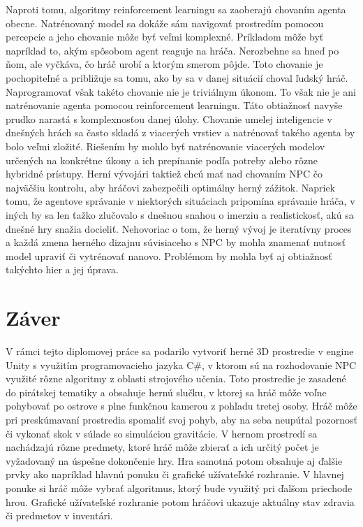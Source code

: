 \documentclass[slovak, master]{diploma}
\begin{document}
Naproti tomu, algoritmy reinforcement learningu sa zaoberajú chovaním agenta obecne. Natrénovaný model sa dokáže sám navigovať prostredím pomocou percepcie a jeho chovanie môže byť veľmi komplexné. Príkladom môže byť napríklad to, akým spôsobom agent reaguje na hráča. Nerozbehne sa hneď po ňom, ale vyčkáva, čo hráč urobí a ktorým smerom pôjde. Toto chovanie je pochopiteľné a približuje sa tomu, ako by sa v danej situácií choval ľudský hráč. Naprogramovať však takéto chovanie nie je triviálnym úkonom. To však nie je ani natrénovanie agenta pomocou reinforcement learningu. Táto obtiažnosť navyše prudko narastá s komplexnosťou danej úlohy. Chovanie umelej inteligencie v dnešných hrách sa často skladá z viacerých vrstiev a natrénovať takého agenta by bolo veľmi zložité. Riešením by mohlo byť natrénovanie viacerých modelov určených na konkrétne úkony a ich prepínanie podľa potreby alebo rôzne hybridné prístupy. Herní vývojári taktiež chcú mať nad chovaním NPC čo najväčšiu kontrolu, aby hráčovi zabezpečili optimálny herný zážitok. Napriek tomu, že agentove správanie v niektorých situáciach pripomína správanie hráča, v iných by sa len ťažko zlučovalo s dnešnou snahou o imerziu a realistickosť, akú sa dnešné hry snažia docieliť. Nehovoriac o tom, že herný vývoj je iteratívny proces a každá zmena herného dizajnu súvisiaceho s NPC by mohla znamenať nutnosť model upraviť či vytrénovať nanovo. Problémom by mohla byť aj obtiažnosť takýchto hier a jej úprava.

\chapter{Záver}
\label{sec:Conclusion}
V rámci tejto diplomovej práce sa podarilo vytvoriť herné 3D prostredie v engine Unity s využitím programovacieho jazyka C\#, v ktorom sú na rozhodovanie NPC využité rôzne algoritmy z oblasti strojového učenia. Toto prostredie je zasadené do pirátskej tematiky a obsahuje hernú slučku, v ktorej sa hráč môže voľne pohybovať po ostrove s plne funkčnou kamerou z pohľadu tretej osoby. Hráč môže pri preskúmavaní prostredia spomaliť svoj pohyb, aby na seba neupútal pozornosť či vykonať skok v súlade so simuláciou gravitácie. V hernom prostredí sa nachádzajú rôzne predmety, ktoré hráč môže zbierať a ich určitý počet je vyžadovaný na úspešne dokončenie hry. Hra samotná potom obsahuje aj ďalšie prvky ako napríklad hlavnú ponuku či grafické užívateľské rozhranie. V hlavnej ponuke si hráč môže vybrať algoritmus, ktorý bude využitý pri ďalšom priechode hrou. Grafické užívateľské rozhranie potom hráčovi ukazuje aktuálny stav zdravia či predmetov v inventári.
\end{document}
